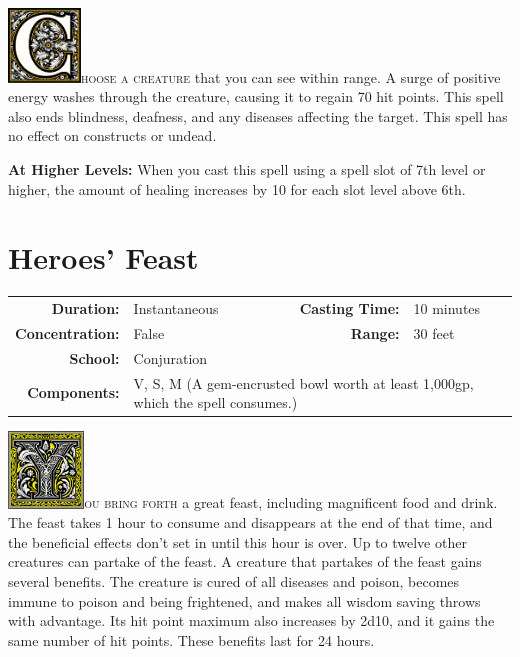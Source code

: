 \documentclass[12pt,showtrims]{memoir}
\begin{document}
\vspace{1\baselineskip}\noindent
\lettrine[lines=4]{\includegraphics[height=56pt]{initials/C.png}}{hoose a creature} that you can see within range. A surge of positive energy washes through the creature, causing it to regain 70 hit points. This spell also ends blindness, deafness, and any diseases affecting the target. This spell has no effect on constructs or undead.

\vspace{8pt} \noindent\textbf{At Higher Levels:} When you cast this spell using a spell slot of 7th level or higher, the amount of healing increases by 10 for each slot level above 6th.
\newpage
\section*{Heroes' Feast}

{
\small\centering\vspace{-6pt}
\begin{tabular}{rlrl}
\toprule

\textbf{Duration:} & Instantaneous &
\textbf{Casting Time:} & 10 minutes \\
\textbf{Concentration:} & False &
\textbf{Range:} & 30 feet \\
\textbf{School:} & Conjuration \\
\textbf{Components:} & \multicolumn{3}{p{0.7\textwidth}}{V, S, M (A gem-encrusted bowl worth at least 1,000gp, which the spell consumes.)}\\

\bottomrule
\end{tabular}
}

\vspace{1\baselineskip}\noindent
\lettrine[lines=4]{\includegraphics[height=58pt]{initials/Y.png}}{ou bring forth} a great feast, including magnificent food and drink. The feast takes 1 hour to consume and disappears at the end of that time, and the beneficial effects don't set in until this hour is over. Up to twelve other creatures can partake of the feast. A creature that partakes of the feast gains several benefits. The creature is cured of all diseases and poison, becomes immune to poison and being frightened, and makes all wisdom saving throws with advantage. Its hit point maximum also increases by 2d10, and it gains the same number of hit points. These benefits last for 24 hours.
\end{document}
